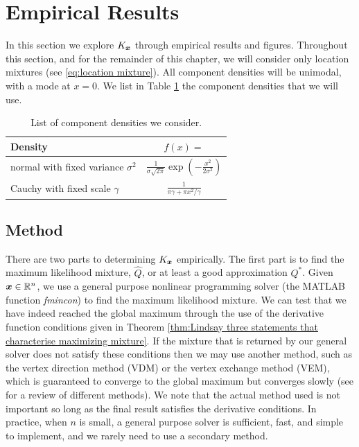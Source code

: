 \section{Empirical Results}
\label{sec:empirical results}
	In this section we explore $K_{\bm{{x}}}$ through empirical results and figures. Throughout this section, and for the remainder of this chapter, we will consider only location mixtures (see \eqref{eq:location mixture}). All component densities will be unimodal, with a mode at $x = 0$. We list in Table \ref{tab:component densities} the component densities that we will use.

	\begin{table}[ht]
	\centering
		\begin{tabular}{l | c}
			Density & $f(x) = $\\
			\hline
			normal with fixed variance $\sigma^2$ & $\frac{1}{\sigma \sqrt{2 \pi}} \exp\left(-\frac{x^2}{2\sigma^2}\right) $\\
			Cauchy with fixed scale $\gamma$ & $\frac{1}{\pi \gamma + \pi x^2/\gamma}$
		\end{tabular}	
		\caption{List of component densities we consider.}
		\label{tab:component densities}
	\end{table}
	

	\subsection{Method}
	There are two parts to determining $K_{\bm{{x}}}$ empirically. The first part is to find the maximum likelihood mixture, $\hat{Q}$, or at least a good approximation $Q^*$. Given ${\bm{{x}}} \in \mathbb{R}^n$, we use a general purpose nonlinear programming solver (the MATLAB function \emph{fmincon}) to find the maximum likelihood mixture. We can test that we have indeed reached the global maximum through the use of the derivative function conditions given in Theorem \ref{thm:Lindsay three statements that characterise maximizing mixture}. If the mixture that is returned by our general solver does not satisfy these conditions then we may use another method, such as the vertex direction method (VDM) or the vertex exchange method (VEM), which is guaranteed to converge to the global maximum but converges slowly (see \cite{Bohning1995-di} for a review of different methods). We note that the actual method used is not important so long as the final result satisfies the derivative conditions. In practice, when $n$ is small, a general purpose solver is sufficient, fast, and simple to implement, and we rarely need to use a secondary method.

